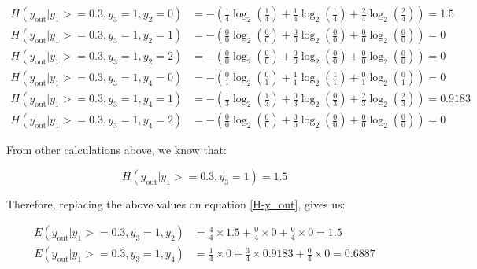 \documentclass[12pt]{article}
\begin{document}
\begin{enumerate}[leftmargin=\labelsep]
\[
    \begin{aligned}
    H(y_{\text{out}} | y_1 >= 0.3 , y_3 = 1, y_2 = 0) & = - \left(\frac{1}{4} \log_2\left(\frac{1}{4}\right) + \frac{1}{4} \log_2\left(\frac{1}{4}\right)
    + \frac{2}{4} \log_2\left(\frac{2}{4}\right)\right) = 1.5                                                                       \\
    H(y_{\text{out}} | y_1 >= 0.3 , y_3 = 1, y_2 = 1) & = - \left(\frac{0}{0} \log_2\left(\frac{0}{0}\right) + \frac{0}{0} \log_2\left(\frac{0}{0}\right)
    + \frac{0}{0} \log_2\left(\frac{0}{0}\right)\right) = 0                                                                     \\
    H(y_{\text{out}} | y_1 >= 0.3 , y_3 = 1, y_2 = 2) & = - \left(\frac{0}{0} \log_2\left(\frac{0}{0}\right) + \frac{0}{0} \log_2\left(\frac{0}{0}\right)
    + \frac{0}{0} \log_2\left(\frac{0}{0}\right)\right) = 0                                                                       \\
    H(y_{\text{out}} | y_1 >= 0.3 , y_3 = 1, y_4 = 0) & = - \left(\frac{0}{1} \log_2\left(\frac{0}{1}\right) + \frac{1}{1} \log_2\left(\frac{1}{1}\right)
    + \frac{0}{1} \log_2\left(\frac{0}{1}\right)\right) = 0                                                                       \\
    H(y_{\text{out}} | y_1 >= 0.3 , y_3 = 1, y_4 = 1) & = - \left(\frac{1}{3} \log_2\left(\frac{1}{3}\right) + \frac{0}{3} \log_2\left(\frac{0}{3}\right)
    + \frac{2}{3} \log_2\left(\frac{2}{3}\right)\right) = 0.9183                                                                      \\
    H(y_{\text{out}} | y_1 >= 0.3 , y_3 = 1, y_4 = 2) & = - \left(\frac{0}{0} \log_2\left(\frac{0}{0}\right) + \frac{0}{0} \log_2\left(\frac{0}{0}\right)
    + \frac{0}{0} \log_2\left(\frac{0}{0}\right)\right) = 0 
    \end{aligned}
    \]

    From other calculations above, we know that:

    \[
        H(y_{\text{out}} | y_1 >= 0.3 , y_3 = 1) = 1.5
    \]

    Therefore, replacing the above values on equation \eqref{H-y_out}, gives us:

    \[
        \begin{aligned}
        E(y_{\text{out}} | y_1 >= 0.3, y_3 = 1, y_2) & = \frac{4}{4} \times 1.5 + \frac{0}{4} \times 0 + \frac{0}{4} \times 0 = 1.5  \\
        E(y_{\text{out}} | y_1 >= 0.3, y_3 = 1, y_4) & = \frac{1}{4} \times 0 + \frac{3}{4} \times 0.9183 + \frac{0}{4} \times 0 = 0.6887
        \end{aligned}
    \]


\end{enumerate}
\end{document}
